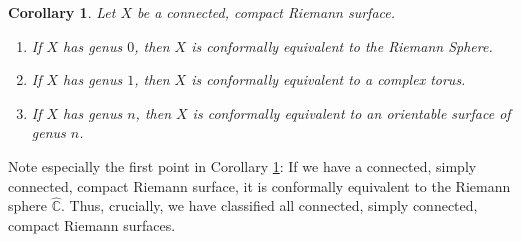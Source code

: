 \documentclass[11pt]{report}
\newtheorem{cor}[thm]{Corollary}
\theoremstyle{definition}
\begin{document}
\begin{cor}\label{ClassificationByGenus}
  Let $X$ be a connected, compact Riemann surface. 
  \begin{enumerate}
    \item If $X$ has genus $0$, then $X$ is conformally equivalent to the Riemann Sphere. 
    \item If $X$ has genus $1$, then $X$ is conformally equivalent to a complex torus.
    \item If $X$ has genus $n$, then $X$ is conformally equivalent to an orientable surface of genus $n$.
  \end{enumerate}
\end{cor}
Note especially the first point in Corollary \ref{ClassificationByGenus}: If we have a connected, simply connected, compact Riemann surface, it is conformally equivalent to the Riemann sphere $\widehat{\mathbb{C}}$. Thus, crucially, we have classified all connected, simply connected, compact Riemann surfaces.
\end{document}
